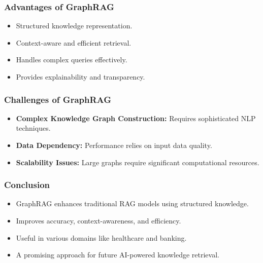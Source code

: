 \begin{frame}[fragile]\frametitle{Advantages of GraphRAG}
    \begin{itemize}
        \item Structured knowledge representation.
        \item Context-aware and efficient retrieval.
        \item Handles complex queries effectively.
        \item Provides explainability and transparency.
    \end{itemize}
\end{frame}

\begin{frame}[fragile]\frametitle{Challenges of GraphRAG}
    \begin{itemize}
        \item \textbf{Complex Knowledge Graph Construction:} Requires sophisticated NLP techniques.
        \item \textbf{Data Dependency:} Performance relies on input data quality.
        \item \textbf{Scalability Issues:} Large graphs require significant computational resources.
    \end{itemize}
\end{frame}

\begin{frame}[fragile]\frametitle{Conclusion}
    \begin{itemize}
        \item GraphRAG enhances traditional RAG models using structured knowledge.
        \item Improves accuracy, context-awareness, and efficiency.
        \item Useful in various domains like healthcare and banking.
        \item A promising approach for future AI-powered knowledge retrieval.
    \end{itemize}
\end{frame}

